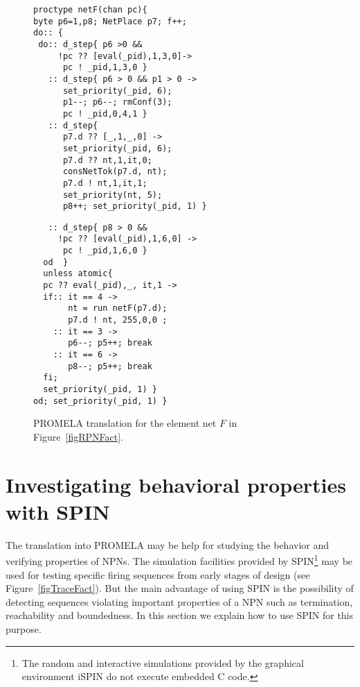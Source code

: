 \documentclass{llncs}
\begin{document}
\mfont
\begin{figure}[h]
\begin{multicols}{2}
\begin{minipage}[t]{0.5\textwidth}\begin{verbatim}
proctype netF(chan pc){
byte p6=1,p8; NetPlace p7; f++;
do:: {
 do:: d_step{ p6 >0 &&
     !pc ?? [eval(_pid),1,3,0]->
      pc ! _pid,1,3,0 }
   :: d_step{ p6 > 0 && p1 > 0 ->
      set_priority(_pid, 6);
      p1--; p6--; rmConf(3);
      pc ! _pid,0,4,1 }
   :: d_step{
      p7.d ?? [_,1,_,0] ->
      set_priority(_pid, 6);
      p7.d ?? nt,1,it,0;
      consNetTok(p7.d, nt);
      p7.d ! nt,1,it,1;
      set_priority(nt, 5);
      p8++; set_priority(_pid, 1) }
\end{verbatim}
\end{minipage}

\begin{minipage}[t]{0.5\textwidth}\begin{verbatim}
   :: d_step{ p8 > 0 &&
     !pc ?? [eval(_pid),1,6,0] ->
      pc ! _pid,1,6,0 }
  od  }
  unless atomic{
  pc ?? eval(_pid),_, it,1 ->
  if:: it == 4 ->
       nt = run netF(p7.d);
       p7.d ! nt, 255,0,0 ;
    :: it == 3 ->
       p6--; p5++; break
    :: it == 6 ->
       p8--; p5++; break
  fi;
  set_priority(_pid, 1) }
od; set_priority(_pid, 1) }
\end{verbatim}
\end{minipage}
\end{multicols}
\caption{PROMELA translation for the element net $F$ in Figure~\ref{figRPNFact}.}
\label{figTransF}
\end{figure}
\nfont




\section{Investigating behavioral properties with SPIN}
\label{sec:prop}

The translation into PROMELA may be help for studying the behavior and verifying properties of NPNs. The simulation facilities provided by SPIN\footnote{The random and interactive simulations provided by the graphical environment iSPIN do not execute embedded C code.}  may be used for testing specific firing sequences from early stages of design (see Figure~\ref{figTraceFact}). But the main advantage of using SPIN is the possibility of detecting sequences violating important properties of a NPN such as termination, reachability and boundedness. In this section we explain how to use SPIN for this purpose.
\end{document}
